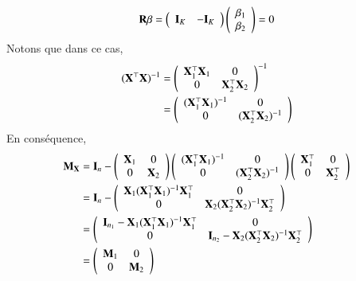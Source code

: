 \documentclass[10pt, reqno]{amsart}
\begin{document}
\begin{align*}
\mathbf{R}\beta =
\left(\begin{array}{cc}
\mathbf{I}_K&-\mathbf{I}_K
\end{array}
\right)
\left(
\begin{array}{c}
\beta_1\\
\beta_2
\end{array}
\right)
=0
\end{align*}
Notons que dans ce cas,
\begin{align*}
(\mathbf X^\top\mathbf X)^{-1} &=
\left(
\begin{array}{cc}
\mathbf X_1^\top\mathbf X_1 &0\\
0&\mathbf X_2^\top\mathbf X_2
\end{array}
\right) ^{-1}\\
&=
\left(
\begin{array}{cc}
(\mathbf X_1^\top\mathbf X_1)^{-1} &0\\
0&(\mathbf X_2^\top\mathbf X_2)^{-1}
\end{array}
\right) 
\end{align*}
En conséquence,
\begin{align*}
\mathbf M_\mathbf X&=\mathbf{I}_n 
- 
\left(
\begin{array}{cc}
\mathbf X_1&0\\
0&\mathbf X_2
\end{array}
\right)
\left(
\begin{array}{cc}
(\mathbf X_1^\top\mathbf X_1)^{-1} &0\\
0&(\mathbf X_2^\top\mathbf X_2)^{-1}
\end{array}
\right) 
\left(
\begin{array}{cc}
\mathbf X_1^\top&0\\
0&\mathbf X_2^\top
\end{array}
\right)
\\
&=\mathbf{I}_n - \left(
\begin{array}{cc}
\mathbf X_1(\mathbf X_1^\top\mathbf X_1)^{-1}\mathbf X_1^\top &0\\
0&\mathbf X_2(\mathbf X_2^\top\mathbf X_2)^{-1}\mathbf X_2^\top
\end{array}
\right) 
\\
&= 
\left(
\begin{array}{cc}
\mathbf{I}_{n_1} - \mathbf X_1(\mathbf X_1^\top\mathbf X_1)^{-1}\mathbf X_1^\top &0\\
0&\mathbf{I}_{n_2} - \mathbf X_2(\mathbf X_2^\top\mathbf X_2)^{-1}\mathbf X_2^\top
\end{array}
\right) \\
&= \left(
\begin{array}{cc}
\mathbf M_1&0\\
0&\mathbf M_2
\end{array}
\right)
\end{align*}
\end{document}
